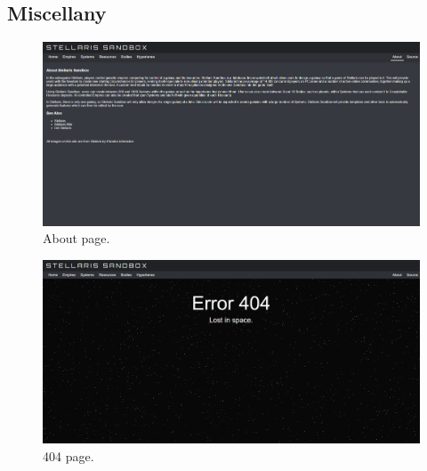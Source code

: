 \documentclass[12pt]{article}
\let\Oldsubsection\subsection
\renewcommand{\subsection}{\FloatBarrier\Oldsubsection}
\begin{document}
\newpage
\subsection{Miscellany}

\begin{figure}[!ht]
  \caption{About page.}
  \includegraphics[width=\textwidth]{screenshots/misc/about.png}
\end{figure}

\begin{figure}[!ht]
  \caption{404 page.}
  \includegraphics[width=\textwidth]{screenshots/misc/404.png}
\end{figure}
\end{document}
